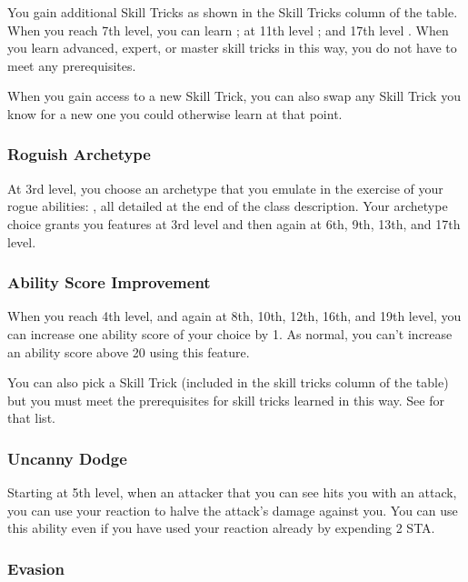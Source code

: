 You gain additional Skill Tricks as shown in the Skill Tricks column of the  table. When you reach 7th level, you can learn ; at 11th level ; and 17th level . When you learn advanced, expert, or master skill tricks in this way, you do not have to meet any prerequisites.

When you gain access to a new Skill Trick, you can also swap any Skill Trick you know for a new one you could otherwise learn at that point.

\subsubsection{Roguish Archetype}

At 3rd level, you choose an archetype that you emulate in the exercise of your rogue abilities: , all detailed at the end of the class description. Your archetype choice grants you features at 3rd level and then again at 6th, 9th, 13th, and 17th level.

\subsubsection{Ability Score Improvement}

When you reach 4th level, and again at 8th, 10th, 12th, 16th, and 19th level, you can increase one ability score of your choice by 1. As normal, you can't increase an ability score above 20 using this feature.

You can also pick a Skill Trick (included in the skill tricks column of the  table) but you must meet the prerequisites for skill tricks learned in this way. See  for that list.

\subsubsection{Uncanny Dodge}

Starting at 5th level, when an attacker that you can see hits you with an attack, you can use your reaction to halve the attack's damage against you. You can use this ability even if you have used your reaction already by expending 2 STA.

\subsubsection{Evasion}

